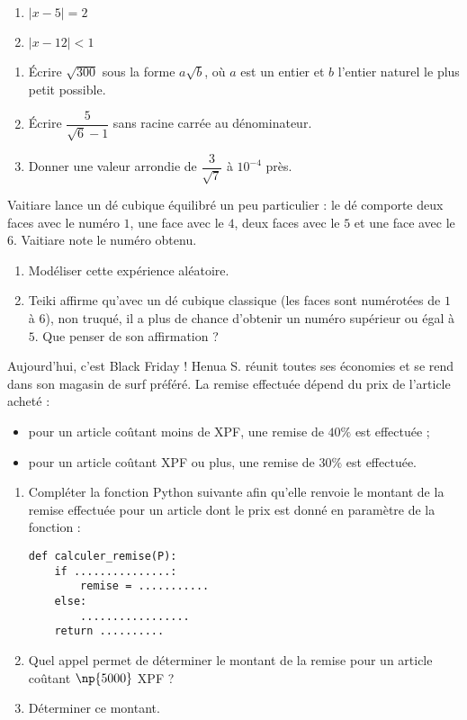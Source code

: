 \documentclass[a4paper,dvipsnames]{article}
\begin{document}
\begin{multicols}{2}
  \begin{enumerate}
    \item $|x-5|=2$
    \item $|x-12|<1$
  \end{enumerate}
\end{multicols}

\bigskip

\exo[3 points] \vspace{-2mm} 
\begin{enumerate}
  \item Écrire $\sqrt{300}$ sous la forme $a\sqrt{b}$, où $a$ est un entier et $b$ l'entier naturel le plus petit possible.
  \item Écrire $\dfrac{5}{\sqrt{6}-1}$ sans racine carrée au dénominateur.
  \item Donner une valeur arrondie de $\dfrac{3}{\sqrt{7}}$ à $10^{-4}$ près.
\end{enumerate}

\bigskip

\exo[3 points] Vaitiare lance un dé cubique équilibré un peu particulier : le dé comporte deux faces avec le numéro $1$, une face avec le $4$, deux faces avec le $5$ et une face avec le $6$. Vaitiare note le numéro obtenu.
\begin{enumerate}
  \item Modéliser cette expérience aléatoire.
  \item Teiki affirme qu'avec un dé cubique \og{}classique\fg{} (les faces sont numérotées de $1$ à $6$), non truqué, il a plus de chance d'obtenir un numéro supérieur ou égal à $5$. Que penser de son affirmation ?
\end{enumerate}

\pagebreak

\exo[4 points] Aujourd'hui, c'est Black Friday ! Henua S. réunit toutes ses économies et se rend dans son magasin de surf préféré. La remise effectuée dépend du prix de l'article acheté :
\begin{itemize}
  \item pour un article coûtant moins de  XPF, une remise de $40\%$ est effectuée ;
  \item pour un article coûtant  XPF ou plus, une remise de $30\%$ est effectuée.
\end{itemize}
\begin{enumerate}
  \item Compléter la fonction Python suivante afin qu'elle renvoie le montant de la remise effectuée pour un article dont le prix est donné en paramètre de la fonction :
    \begin{verbatim}
def calculer_remise(P):
    if ...............:
        remise = ...........
    else:
        .................
    return ..........
    \end{verbatim}
  \item Quel appel permet de déterminer le montant de la remise pour un article coûtant $\np{5000}$ XPF ?
  \item Déterminer ce montant.
\end{enumerate}
\end{document}
